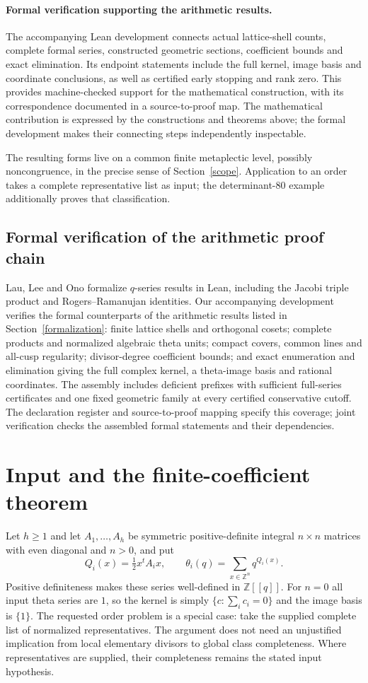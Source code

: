 \documentclass[11pt]{article}
\theoremstyle{remark}\newtheorem{remark}[theorem]{Remark}
\newcommand{\Z}{\mathbb Z}\newcommand{\Q}{\mathbb Q}
\begin{document}
\paragraph{Formal verification supporting the arithmetic results.}
The accompanying Lean development connects actual lattice-shell counts,
complete formal series, constructed geometric sections, coefficient bounds
and exact elimination. Its endpoint statements include the full kernel,
image basis and coordinate conclusions, as well as certified early stopping
and rank zero. This provides machine-checked support for the mathematical
construction, with its correspondence documented in a source-to-proof map.
The mathematical contribution is expressed by the constructions and
theorems above; the formal development makes their connecting steps
independently inspectable.

The resulting forms live on a common finite metaplectic level, possibly
noncongruence, in the precise sense of Section~\ref{scope}. Application to
an order takes a complete representative list as input; the determinant-$80$
example additionally proves that classification.

\subsection{Formal verification of the arithmetic proof chain}
Lau, Lee and Ono \cite{lau-lee-ono} formalize $q$-series results in Lean,
including the Jacobi triple product and Rogers--Ramanujan identities.
Our accompanying development verifies the formal counterparts of the
arithmetic results listed in Section~\ref{formalization}: finite lattice
shells and orthogonal cosets; complete products and normalized algebraic
theta units; compact covers, common lines and all-cusp regularity;
divisor-degree coefficient bounds; and exact enumeration and elimination
giving the full complex kernel, a theta-image basis and rational coordinates.
The assembly includes deficient prefixes with sufficient full-series
certificates and one fixed geometric family at every certified
conservative cutoff. The declaration register and source-to-proof mapping
specify this coverage; joint verification checks the assembled formal
statements and their dependencies.

\section{Input and the finite-coefficient theorem}\label{input}
Let $h\geq1$ and let $A_1,\ldots,A_h$ be symmetric positive-definite integral $n\times n$
matrices with even diagonal and $n>0$, and put
\[
 Q_i(x)=\tfrac12x^tA_ix,\qquad
 \theta_i(q)=\sum_{x\in\Z^n}q^{Q_i(x)}.
\]
Positive definiteness makes these series well-defined in $\Z[[q]]$.
For $n=0$ all input theta series are $1$, so the kernel is simply
$\{c:\sum_i c_i=0\}$ and the image basis is $\{1\}$.
The requested order problem is a special case: take the supplied complete
list of normalized representatives. The argument does not need an
unjustified implication from local elementary divisors to global class
completeness. Where representatives are supplied, their completeness remains
the stated input hypothesis.
\end{document}

